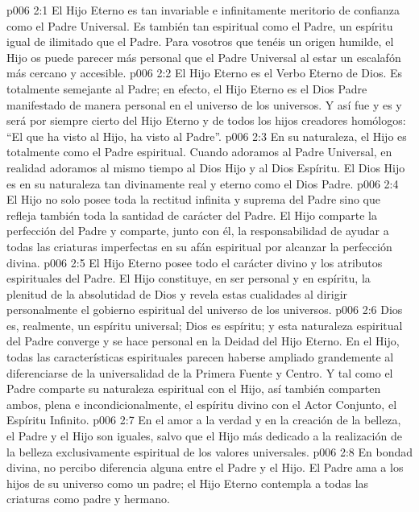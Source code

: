 \vs p006 2:1 El Hijo Eterno es tan invariable e infinitamente meritorio de confianza como el Padre Universal. Es también tan espiritual como el Padre, un espíritu igual de ilimitado que el Padre. Para vosotros que tenéis un origen humilde, el Hijo os puede parecer más personal que el Padre Universal al estar un escalafón más cercano y accesible.
\vs p006 2:2 El Hijo Eterno es el Verbo Eterno de Dios. Es totalmente semejante al Padre; en efecto, el Hijo Eterno es el Dios Padre manifestado de manera personal en el universo de los universos. Y así fue y es y será por siempre cierto del Hijo Eterno y de todos los hijos creadores homólogos: “El que ha visto al Hijo, ha visto al Padre”.
\vs p006 2:3 En su naturaleza, el Hijo es totalmente como el Padre espiritual. Cuando adoramos al Padre Universal, en realidad adoramos al mismo tiempo al Dios Hijo y al Dios Espíritu. El Dios Hijo es en su naturaleza tan divinamente real y eterno como el Dios Padre.
\vs p006 2:4 El Hijo no solo posee toda la rectitud infinita y suprema del Padre sino que refleja también toda la santidad de carácter del Padre. El Hijo comparte la perfección del Padre y comparte, junto con él, la responsabilidad de ayudar a todas las criaturas imperfectas en su afán espiritual por alcanzar la perfección divina.
\vs p006 2:5 El Hijo Eterno posee todo el carácter divino y los atributos espirituales del Padre. El Hijo constituye, en ser personal y en espíritu, la plenitud de la absolutidad de Dios y revela estas cualidades al dirigir personalmente el gobierno espiritual del universo de los universos.
\vs p006 2:6 Dios es, realmente, un espíritu universal; Dios es espíritu; y esta naturaleza espiritual del Padre converge y se hace personal en la Deidad del Hijo Eterno. En el Hijo, todas las características espirituales parecen haberse ampliado grandemente al diferenciarse de la universalidad de la Primera Fuente y Centro. Y tal como el Padre comparte su naturaleza espiritual con el Hijo, así también comparten ambos, plena e incondicionalmente, el espíritu divino con el Actor Conjunto, el Espíritu Infinito.
\vs p006 2:7 En el amor a la verdad y en la creación de la belleza, el Padre y el Hijo son iguales, salvo que el Hijo  más dedicado a la realización de la belleza exclusivamente espiritual de los valores universales.
\vs p006 2:8 En bondad divina, no percibo diferencia alguna entre el Padre y el Hijo. El Padre ama a los hijos de su universo como un padre; el Hijo Eterno contempla a todas las criaturas como padre y hermano.
